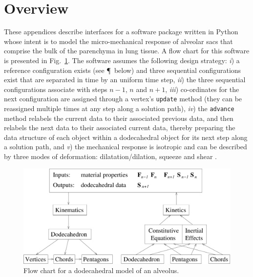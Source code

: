 \section{Overview}

These appendices describe interfaces for a software package written in Python whose intent is to model the micro-mechanical response of alveolar sacs that comprise the bulk of the parenchyma in lung tissue.  A flow chart for this software is presented in Fig.~\ref{figFlow}.  The software assumes the following design strategy: \textit{i\/}) a reference configuration exists (see \P\ below) and three sequential configurations exist that are separated in time by an uniform time step, \textit{ii\/}) the three sequential configurations associate with steps $n \! - \! 1$, $n$ and $n \! + \! 1$, \textit{iii\/}) co-ordinates for the next configuration are assigned through a vertex's \texttt{update} method (they can be reassigned multiple times at any step along a solution path), \textit{iv\/}) the \texttt{advance} method relabels the current data to their associated previous data, and then relabels the next data to their associated current data, thereby preparing the data structure of each object within a dodecahedral object for its next step along a solution path, and \textit{v\/}) the mechanical response is isotropic and can be described by three modes of deformation: dilatation\slash dilation, squeeze and shear \cite{Freedetal17,FreedZamani19}.

\begin{figure}
	\centering
	\includegraphics[width=\columnwidth]{figures/flow.pdf}
	\caption{Flow chart for a dodecahedral model of an alveolus.}
	\label{figFlow}
\end{figure}

